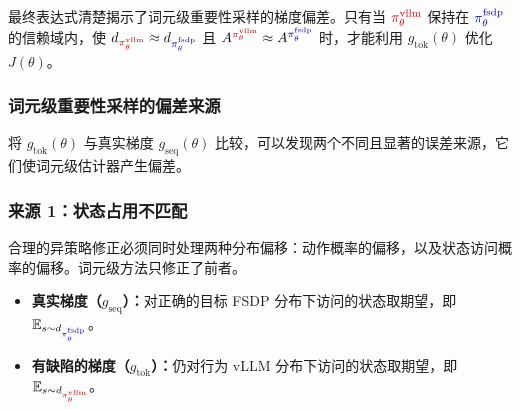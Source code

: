 
最终表达式清楚揭示了词元级重要性采样的梯度偏差。只有当 $\piv$ 保持在 $\pif$ 的信赖域内，使 $d_{\piv}\approx d_{\pif}$ 且 $A^{\piv}\approx A^{\pif}$ 时，才能利用 $g_{\mathrm{tok}}(\theta)$ 优化 $J(\theta)$。





\hypertarget{src-27b211a5-58b7-807b-88a0-ed3abb1a0eea}{}
\subsubsection*{词元级重要性采样的偏差来源}



将 $g_{\mathrm{tok}}(\theta)$ 与真实梯度 $g_{\mathrm{seq}}(\theta)$ 比较，可以发现两个不同且显著的误差来源，它们使词元级估计器产生偏差。



\hypertarget{src-27b211a5-58b7-80fd-a20c-f07a56e3a9a9}{}
\subsubsection*{来源 1：状态占用不匹配}



合理的异策略修正必须同时处理两种分布偏移：动作概率的偏移，以及状态访问概率的偏移。词元级方法只修正了前者。



\begin{itemize}

\item \textbf{真实梯度（$g_{\mathrm{seq}}$）：}对正确的目标 FSDP 分布下访问的状态取期望，即 $\mathbb E_{s\sim d_{\pif}}$。


\item \textbf{有缺陷的梯度（$g_{\mathrm{tok}}$）：}仍对行为 vLLM 分布下访问的状态取期望，即 $\mathbb E_{s\sim d_{\piv}}$。

\end{itemize}


